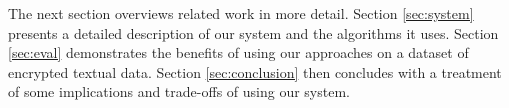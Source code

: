The next section overviews related work in more detail.  Section
\ref{sec:system} presents a detailed description of our system and the 
algorithms it uses.
Section \ref{sec:eval} demonstrates the benefits of using our approaches
on a dataset of encrypted textual data. 
Section \ref{sec:conclusion} then concludes with a treatment of
some implications and trade-offs of using our system.
